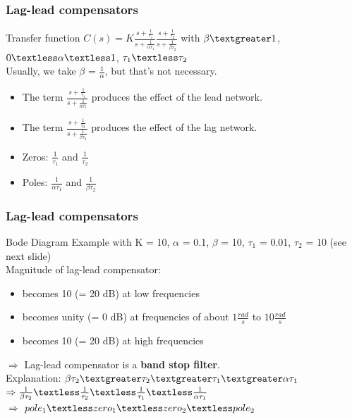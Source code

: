 \begin{frame}
\frametitle{Lag-lead compensators}
\begin{block}{Transfer function}
	$C(s) = K\frac{s + \frac{1}{\tau_1}}{s + \frac{1}{\alpha\tau_1}}\frac{s + \frac{1}{\tau_2}}{s + \frac{1}{\beta\tau_2}}$ with $\beta \textgreater 1$, $0 \textless \alpha \textless 1$, $\tau_1 \textless \tau_2$ \\
	Usually, we take $\beta$ = $\frac{1}{\alpha}$, but that's not necessary. \\
	\begin{itemize}
	\item The term $\frac{s + \frac{1}{\tau_1}}{s + \frac{1}{\alpha\tau_1}}$ produces the effect of the lead network.
	\item The term $\frac{s + \frac{1}{\tau_2}}{s + \frac{1}{\beta\tau_2}}$ produces the effect of the lag network.
	\item Zeros: $\frac{1}{\tau_1}$ and $\frac{1}{\tau_2}$
	\item Poles: $\frac{1}{\alpha \tau_1}$ and $\frac{1}{\beta \tau_2}$
	\end{itemize}
\end{block}

\end{frame}

\begin{frame}
\frametitle{Lag-lead compensators}
\begin{block}{Bode Diagram}
Example with K = 10, $\alpha$ = 0.1, $\beta$ = 10, $\tau_1$ = 0.01, $\tau_2$ = 10 (see next slide) \\
Magnitude of lag-lead compensator:
\begin{itemize}
\item becomes 10 (= 20 dB) at low frequencies
\item becomes unity (= 0 dB) at frequencies of about $1 \frac{rad}{s}$ to $10 \frac{rad}{s}$
\item becomes 10 (= 20 dB) at high frequencies
\end{itemize}
$\Rightarrow$ Lag-lead compensator is a {\bf band stop filter}. \\
Explanation: $\beta \tau_2 \textgreater \tau_2 \textgreater \tau_1 \textgreater \alpha \tau_1$ \\
$\Rightarrow \frac{1}{\beta \tau_2} \textless \frac{1}{\tau_2} \textless \frac{1}{\tau_1} \textless \frac{1}{\alpha \tau_1}$ \\
$\Rightarrow$ $pole_1 \textless zero_1 \textless zero_2 \textless pole_2$
\end{block}
\end{frame}

